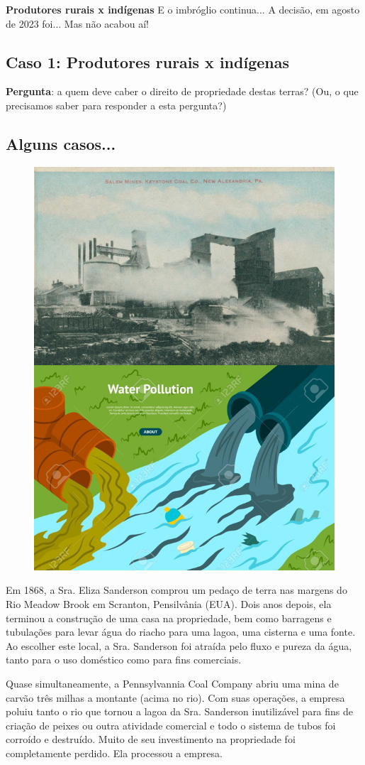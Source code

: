 \documentclass[a4paper,12pt]{article}[abntex2]
\begin{document}
\textbf{Produtores rurais x indígenas}
E o imbróglio continua...
A decisão, em agosto de 2023 foi...
Mas não acabou aí! 

\subsection{\textbf{Caso 1: Produtores rurais x indígenas}}
\textbf{Pergunta}: a quem deve caber o direito de propriedade destas terras? (Ou, o que precisamos saber para responder a esta pergunta?)

\subsection{\textbf{Alguns casos... }}
\begin{figure}[H]
    \centering
    \includegraphics[width=0.5\linewidth]{Imagens/a4i5.png}
\end{figure}
Em 1868, a Sra. Eliza Sanderson comprou um pedaço de terra nas margens do Rio Meadow Brook em Scranton, Pensilvânia (EUA). Dois anos depois, ela terminou a construção de uma casa na propriedade, bem como barragens e tubulações para levar água do riacho para uma lagoa, uma cisterna e uma fonte. Ao escolher este local, a Sra. Sanderson foi atraída pelo fluxo e pureza da água, tanto para o uso doméstico como para fins comerciais.

Quase simultaneamente, a Pennsylvannia Coal Company abriu uma mina de carvão três milhas a montante (acima no rio). Com suas operações, a empresa poluiu tanto o rio que tornou a lagoa da Sra. Sanderson inutilizável para fins de criação de peixes ou outra atividade comercial e todo o sistema de tubos foi corroído e destruído. Muito de seu investimento na propriedade foi completamente perdido. Ela processou a empresa.
\end{document}
